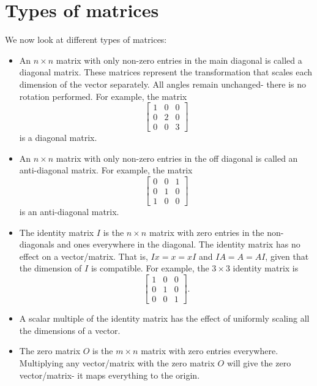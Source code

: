 \documentclass[a4paper, openany]{memoir}
\begin{document}
    \section{Types of matrices}
    We now look at different types of matrices:
    \begin{itemize}
        \item An $n \times n$ matrix with only non-zero entries in the main diagonal is called a diagonal matrix. These matrices represent the transformation that scales each dimension of the vector separately. All angles remain unchanged- there is no rotation performed. For example, the matrix 
        \[\begin{bmatrix}
            1 & 0 & 0 \\
            0 & 2 & 0 \\
            0 & 0 & 3
        \end{bmatrix}\]
        is a diagonal matrix.

        \item An $n \times n$ matrix with only non-zero entries in the off diagonal is called an anti-diagonal matrix. For example, the matrix 
        \[\begin{bmatrix}
            0 & 0 & 1 \\
            0 & 1 & 0 \\
            1 & 0 & 0
        \end{bmatrix}\]
        is an anti-diagonal matrix.
    
        \item The identity matrix $I$ is the $n \times n$ matrix with zero entries in the non-diagonals and ones everywhere in the diagonal. The identity matrix has no effect on a vector/matrix. That is, $Ix = x = xI$ and $IA = A = AI$, given that the dimension of $I$ is compatible. For example, the $3 \times 3$ identity matrix is
        \[\begin{bmatrix}
            1 & 0 & 0 \\
            0 & 1 & 0 \\
            0 & 0 & 1
        \end{bmatrix}.\]
    
        \item A scalar multiple of the identity matrix has the effect of uniformly scaling all the dimensions of a vector.
    
        \item The zero matrix $O$ is the $m \times n$ matrix with zero entries everywhere. Multiplying any vector/matrix with the zero matrix $O$ will give the zero vector/matrix- it maps everything to the origin.
    

\end{itemize}
\end{document}
